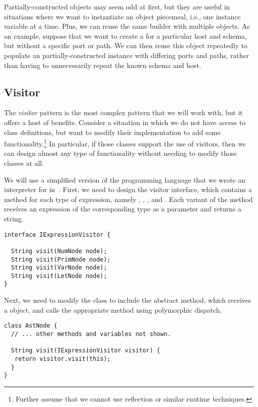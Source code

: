 Partially-constructed objects may seem odd at first, but they are useful in situations where we want to instantiate an object piecemeal, i.e., one instance variable at a time. 
Plus, we can reuse the same builder with multiple objects. 
As an example, suppose that we want to create a  for a particular host and schema, but without a specific port or path. 
We can then reuse this object repeatedly to populate an partially-constructed instance with differing ports and paths, rather than having to unnecessarily repeat the known schema and host.

\subsection{Visitor}

The \emph{visitor} pattern is the most complex pattern that we will work with, but it offers a host of benefits. 
Consider a situation in which we do not have access to class definitions, but want to modify their implementation to add some functionality.\footnote{Further assume that we cannot use reflection or similar runtime techniques.} 
In particular, if those classes support the use of visitors, then we can design almost any type of functionality without needing to modify those classes at all.

We will use a simplified version of the programming language that we wrote an interpreter for in~. 
First, we need to design the visitor interface, which contains a  method for each type of expression, namely , , , and . 
Each variant of the  method receives an expression of the corresponding type as a parameter and returns a string.

\begin{lstlisting}[language=MyJava]
interface IExpressionVisitor {
  
  String visit(NumNode node);
  String visit(PrimNode node);
  String visit(VarNode node);
  String visit(LetNode node);
}
\end{lstlisting}

Next, we need to modify the  class to include the abstract  method, which receives a  object, and calls the appropriate  method using polymorphic dispatch. 

\begin{lstlisting}[language=MyJava]
class AstNode {
  // ... other methods and variables not shown.

  String visit(IExpressionVisitor visitor) {
   return visitor.visit(this);
  }
}
\end{lstlisting}

